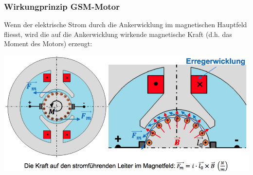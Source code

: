 \subsubsection{Wirkungprinzip GSM-Motor}
Wenn der elektrische Strom durch die Ankerwicklung im magnetischen Hauptfeld fliesst, wird die auf die Ankerwicklung wirkende magnetische Kraft (d.h. das Moment des Motors) erzeugt:

\includegraphics[width = 0.8 \linewidth]{./Pics/VL45/GSMMotor}

